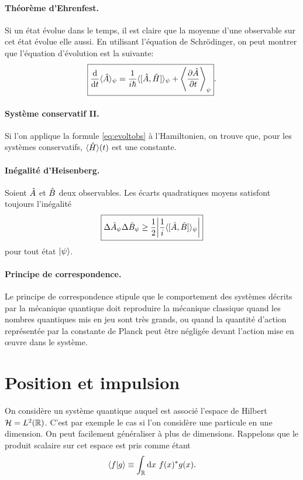 \documentclass[11pt,a4paper,oneside]{article}
\begin{document}
\paragraph{Théorème d'Ehrenfest.} Si un état évolue dans le temps, il est claire que la moyenne d'une observable sur cet état évolue elle aussi. En utilisant l'équation de Schrödinger, on peut montrer que l'équation d'évolution est la suivante:
\begin{equation}
    \boxed{\dv{}{t}\langle\hat{A}\rangle_\psi = \frac{1}{i\hbar}\langle[\hat{A},\hat{H}]\rangle_\psi+\left\langle\pdv{\hat{A}}{t}\right\rangle_\psi}.\label{eq:evoltobs}
\end{equation}

\paragraph{Système conservatif II.} Si l'on applique la formule \eqref{eq:evoltobs} à l'Hamiltonien, on trouve que, pour les systèmes conservatifs, $\langle\hat{H}\rangle(t)$ est une constante.

\paragraph{Inégalité d'Heisenberg.} Soient $\hat{A}$ et $\hat{B}$ deux observables. Les écarts quadratiques moyens satisfont toujours l'inégalité
\begin{equation}
    \boxed{\Delta\hat{A}_\psi\Delta\hat{B}_\psi\geq\frac{1}{2}\abs{\frac{1}{i}\langle[\hat{A},\hat{B}]\rangle_\psi}}
\end{equation}
pour tout état $\ket{\psi}$. 

\paragraph{Principe de correspondence.} Le principe de correspondence stipule que le comportement des systèmes décrits par la mécanique quantique doit reproduire la mécanique classique quand les nombres quantiques mis en jeu sont très grands, ou quand la quantité d'action représentée par la constante de Planck peut être négligée devant l'action mise en œuvre dans le système.


\section{Position et impulsion}

On considère un système quantique auquel est associé l'espace de Hilbert $\mathcal{H}=L^2(\mathbb{R})$. C'est par exemple le cas si l'on considère une particule en une dimension. On peut facilement généraliser à plus de dimensions. Rappelons que le produit scalaire sur cet espace est pris comme étant
\begin{equation}
    \braket{f}{g} \equiv \int_{\mathbb{R}}\text{d} x~f(x)^*g(x).
\end{equation}
\end{document}
